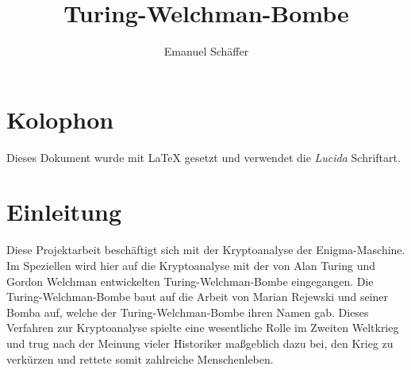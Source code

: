 \documentclass[ngerman, a4paper, footsepline, headsepline]{scrreport}
\begin{document}
	\setcounter{page}{1}
	
	\subject{Projektarbeit zur Kryptoanalyse der Enigma-Maschine durch eine Software-Nachbildung der Turing-Welchman-Bombe\\
	der Fakultät Elektrotechnik und Informatik}
	\title{Turing-Welchman-Bombe}
	\author{Emanuel Schäffer}
	\publishers{RWU--University of Applied Sciences\\Prof. Dipl.-Math. Ekkehard Löhmann}
	\maketitle
	
	\cleardoublepage
	\chapter*{Kolophon}
	Dieses Dokument wurde mit \LaTeX{} gesetzt und verwendet die \textsl{Lucida} Schriftart.
	
	\cleardoublepage
	\tableofcontents
	
	\chapter*{Einleitung}\label{ch:einleitung}
	Diese Projektarbeit beschäftigt sich mit der Kryptoanalyse der Enigma-Maschine.
	Im Speziellen wird hier auf die Kryptoanalyse mit der von Alan Turing und Gordon Welchman entwickelten \glqq Turing-Welchman-Bombe\grqq{} eingegangen.
	Die Turing-Welchman-Bombe baut auf die Arbeit von Marian Rejewski und seiner \glqq Bomba\grqq{} auf, welche der Turing-Welchman-Bombe ihren Namen gab.
	Dieses Verfahren zur Kryptoanalyse spielte eine wesentliche Rolle im Zweiten Weltkrieg und trug nach der Meinung vieler Historiker maßgeblich dazu bei, den Krieg zu verkürzen und rettete somit zahlreiche Menschenleben.
	
	\cleardoublepage
	\setcounter{page}{1}
	
	
	
	
	
	
	
	
	
%	
	
	\newpage
\end{document}
